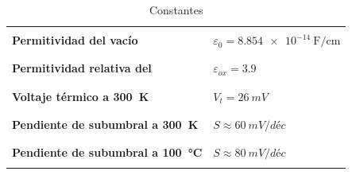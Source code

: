 \documentclass[10pt]{article}
\begin{document}
\begin{table}
	\centering
	\begin{tabular}{|l|l|}
		\hline
		                                                     &                                                          \\
		\textbf{Permitividad del vacío}                      & $\varepsilon_0 = \SI{8.854e-14}{\farad\per\centi\meter}$ \\
		                                                     &                                                          \\
		\hline
		                                                     &                                                          \\
		\textbf{Permitividad relativa del \ch{SiO2}}         & $\varepsilon_{ox} = \num{3.9}$                           \\
		                                                     &                                                          \\
		\hline
		                                                     &                                                          \\
		\textbf{Voltaje térmico a \SI{300}{K}}               & $V_t = \SI{26}{mV}$                                      \\
		                                                     &                                                          \\
		\hline
		                                                     &                                                          \\
		\textbf{Pendiente de subumbral a \SI{300}{K}}        & $S \approx \SI{60}{mV/déc}$                              \\
		                                                     &                                                          \\
		\hline
		                                                     &                                                          \\
		\textbf{Pendiente de subumbral a \SI{100}{\celsius}} & $S \approx \SI{80}{mV/déc}$                              \\
		                                                     &                                                          \\
		\hline
	\end{tabular}
	\caption{Constantes}
\end{table}
\end{document}
